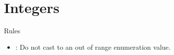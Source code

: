 \section{Integers}

\begin{frame}[t]{Rules}
\begin{itemize}
  \item {}: 
        Do not cast to an out of range enumeration value.
\end{itemize}
\end{frame}


